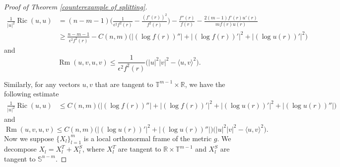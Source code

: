 \documentclass[11pt,letterpaper]{amsart}
\DeclareMathOperator{\Ric}{Ric}
\theoremstyle{definition}
\theoremstyle{remark}
\numberwithin{equation}{section}
\begin{document}
\begin{proof}[Proof of Theorem \ref{counterexample of splitting}]
\begin{equation}
\begin{aligned}
\frac{1}{|u|^2}\Ric(u,u)
&=(n-m-1)\Big(\frac{1}{\epsilon^2f^{2}(r)}-\frac{(f'(r))^2}{f^2(r)}\Big)-\frac{f''(r)}{f(r)}-\frac{2(m-1)f'(r)u'(r)}{mf(r)u(r)}\\
&\geq \frac{n-m-1}{\epsilon^2f^2(r)}-C(n,m)\Big(\big|(\log f(r))''\big|+\big|(\log f(r))'\big|^2+\big|(\log u(r))'\big|^2\Big)
\end{aligned}
\end{equation}
and 
\begin{equation}\label{es2_S}
\operatorname{Rm}(u,v,u,v)\leq \frac{1}{\epsilon^2f^2(r)}\Big(|u|^2|v|^2-\langle u,v\rangle^2\Big).
\end{equation}

Similarly, for any vectors $ u,v$ that are tangent to $\mathbb{T}^{m-1}\times \mathbb{R}$, we have the following estimate
\begin{equation}\label{es1_T}
\begin{aligned}
\frac{1}{|u|^2}\Ric(u,u)
&\leq C(n,m)\Big(\big|(\log f(r))''\big|+\big|(\log f(r))'\big|^2+\big|(\log u(r))'\big|^2+\big|(\log u(r))''\big|\Big)
\end{aligned}
\end{equation}
and 
\begin{equation}\label{es2_T}
\operatorname{Rm}(u,v,u,v)\leq C(n,m)\Big(\big|(\log u(r))'\big|^2+\big|(\log u(r))''\big|\Big)\Big(|u|^2|v|^2-\langle u,v\rangle^2\Big).
\end{equation}
Now we suppose $\{X_{l}\}_{l=1}^{m}$ is a local orthonormal frame of the metric $g$. We decompose $X_l = X_l^T + X_l^S$, where $X_l^T$ are tangent to $\mathbb{R}\times \mathbb{T}^{m-1}$ and $X_l^S$ are tangent to $\mathbb{S}^{n-m}$.


\end{proof}
\end{document}
